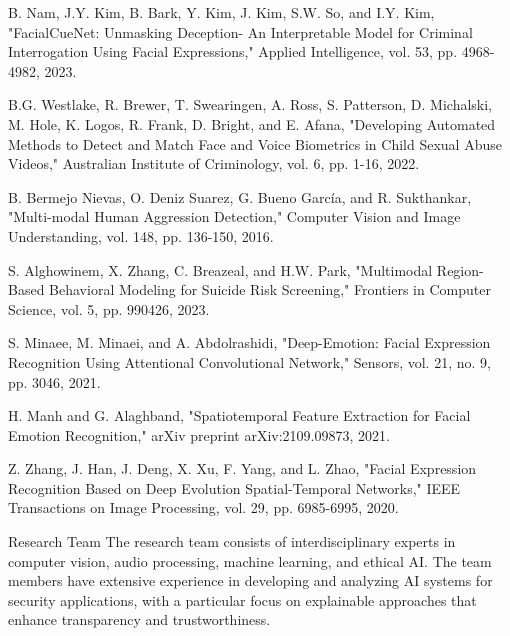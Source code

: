 \documentclass[conference,compsoc]{IEEEtran}
\begin{document}
\begin{thebibliography}{00}
 B. Nam, J.Y. Kim, B. Bark, Y. Kim, J. Kim, S.W. So, and I.Y. Kim, "FacialCueNet: Unmasking Deception- An Interpretable Model for Criminal Interrogation Using Facial Expressions," Applied Intelligence, vol. 53, pp. 4968-4982, 2023.

 B.G. Westlake, R. Brewer, T. Swearingen, A. Ross, S. Patterson, D. Michalski, M. Hole, K. Logos, R. Frank, D. Bright, and E. Afana, "Developing Automated Methods to Detect and Match Face and Voice Biometrics in Child Sexual Abuse Videos," Australian Institute of Criminology, vol. 6, pp. 1-16, 2022.

 B. Bermejo Nievas, O. Deniz Suarez, G. Bueno García, and R. Sukthankar, "Multi-modal Human Aggression Detection," Computer Vision and Image Understanding, vol. 148, pp. 136-150, 2016.

 S. Alghowinem, X. Zhang, C. Breazeal, and H.W. Park, "Multimodal Region-Based Behavioral Modeling for Suicide Risk Screening," Frontiers in Computer Science, vol. 5, pp. 990426, 2023.

 S. Minaee, M. Minaei, and A. Abdolrashidi, "Deep-Emotion: Facial Expression Recognition Using Attentional Convolutional Network," Sensors, vol. 21, no. 9, pp. 3046, 2021.

 H. Manh and G. Alaghband, "Spatiotemporal Feature Extraction for Facial Emotion Recognition," arXiv preprint arXiv:2109.09873, 2021.

 Z. Zhang, J. Han, J. Deng, X. Xu, F. Yang, and L. Zhao, "Facial Expression Recognition Based on Deep Evolution Spatial-Temporal Networks," IEEE Transactions on Image Processing, vol. 29, pp. 6985-6995, 2020.
\end{thebibliography}

\begin{IEEEbiography}[{\texttt{[image: ]}}]{Research Team}
The research team consists of interdisciplinary experts in computer vision, audio processing, machine learning, and ethical AI. The team members have extensive experience in developing and analyzing AI systems for security applications, with a particular focus on explainable approaches that enhance transparency and trustworthiness.
\end{IEEEbiography}
\end{document}
